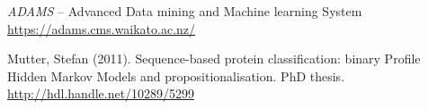 %

\begin{thebibliography}{999}

		\textit{ADAMS} -- Advanced Data mining and Machine learning System \\
		\url{https://adams.cms.waikato.ac.nz/}{}

		Mutter, Stefan (2011). Sequence-based protein classification: binary Profile
		Hidden Markov Models and propositionalisation. PhD thesis. \\
		\url{http://hdl.handle.net/10289/5299}{}

\end{thebibliography}
